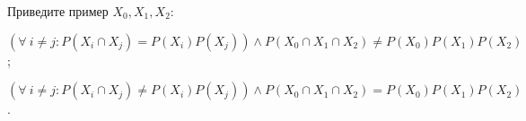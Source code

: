 Приведите пример $X_0, X_1, X_2$:
\begin{enumcyr}
    \item $\left( \forall~ i \neq j: P(X_i \cap X_j) = P(X_i) P(X_j) \right) \land P(X_0 \cap X_1 \cap X_2) \neq P(X_0)
	    P(X_1) P(X_2)$;
    \item $\left( \forall~ i \neq j: P(X_i \cap X_j) \neq P(X_i) P(X_j) \right) \land P(X_0 \cap X_1 \cap X_2) = P(X_0)
	    P(X_1) P(X_2)$.
\end{enumcyr}